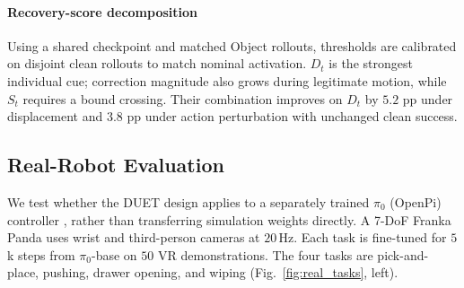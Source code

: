 \documentclass[letterpaper, 10 pt, conference]{ieeeconf}
\begin{document}
\begin{table}[t]
\caption{Component and gate-score ablations (success, \%).}
\label{tab:ablations}
\centering
{}
\end{table}


\paragraph{Recovery-score decomposition}
Using a shared checkpoint and matched Object rollouts, thresholds are calibrated on disjoint clean rollouts to match nominal activation. $D_t$ is the strongest individual cue; correction magnitude also grows during legitimate motion, while $S_t$ requires a bound crossing. Their combination improves on $D_t$ by $5.2$ pp under displacement and $3.8$ pp under action perturbation with unchanged clean success.

\subsection{Real-Robot Evaluation}
\label{sec:real_robot}
We test whether the DUET design applies to a separately trained $\pi_0$ (OpenPi) controller \cite{pi0}, rather than transferring simulation weights directly. A 7-DoF Franka Panda uses wrist and third-person cameras at $20$\,Hz. Each task is fine-tuned for $5$k steps from $\pi_0$-base on $50$ VR demonstrations. The four tasks are pick-and-place, pushing, drawer opening, and wiping (Fig.~\ref{fig:real_tasks}, left).
\end{document}
